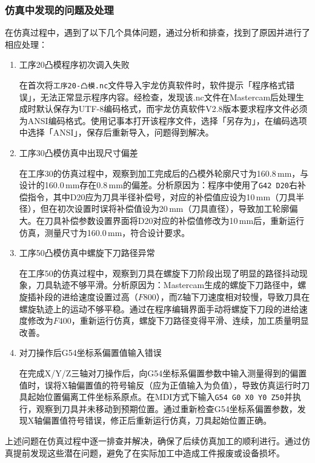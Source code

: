 \documentclass{xautCADreport}
\begin{document}
\subsubsection{仿真中发现的问题及处理}

在仿真过程中，遇到了以下几个具体问题，通过分析和排查，找到了原因并进行了相应处理：

\begin{enumerate}
  \item 工序20凸模程序初次调入失败
  
  在首次将\texttt{工序20-凸模.nc}文件导入宇龙仿真软件时，软件提示「程序格式错误」，无法正常显示程序内容。经检查，发现该.nc文件在Mastercam后处理生成时默认保存为UTF-8编码格式，而宇龙仿真软件V2.8版本要求程序文件必须为ANSI编码格式。使用记事本打开该程序文件，选择「另存为」，在编码选项中选择「ANSI」，保存后重新导入，问题得到解决。
  
  \item 工序30凸模仿真中出现尺寸偏差
  
  在工序30的仿真过程中，观察到加工完成后的凸模外轮廓尺寸为160.8\,mm，与设计的160.0\,mm存在0.8\,mm的偏差。分析原因为：程序中使用了\verb|G42 D20|右补偿指令，其中D20应为刀具半径补偿号，对应的补偿值应设为10\,mm（刀具半径），但在初次设置时误将补偿值设为20\,mm（刀具直径），导致加工轮廓偏大。在刀具补偿参数设置界面将D20对应的补偿值修改为10\,mm后，重新运行仿真，测量尺寸为160.0\,mm，符合设计要求。
  
  \item 工序50凸模仿真中螺旋下刀路径异常
  
  在工序50的仿真过程中，观察到刀具在螺旋下刀阶段出现了明显的路径抖动现象，刀具轨迹不够平滑。分析原因为：Mastercam生成的螺旋下刀路径中，螺旋插补段的进给速度设置过高（$F800$），而Z轴下刀速度相对较慢，导致刀具在螺旋轨迹上的运动不够平稳。通过在程序编辑界面手动将螺旋下刀段的进给速度修改为$F400$，重新运行仿真，螺旋下刀路径变得平滑、连续，加工质量明显改善。
  
  \item 对刀操作后G54坐标系偏置值输入错误
  
  在完成X/Y/Z三轴对刀操作后，向G54坐标系偏置参数中输入测量得到的偏置值时，误将X轴偏置值的符号输反（应为正值输入为负值），导致仿真运行时刀具起始位置偏离工件坐标系原点。在MDI方式下输入\verb|G54 G0 X0 Y0 Z50|并执行，观察到刀具并未移动到预期位置。通过重新检查G54坐标系偏置参数，发现X轴偏置值符号错误，修正后重新运行仿真，刀具起始位置正确。
\end{enumerate}

上述问题在仿真过程中逐一排查并解决，确保了后续仿真加工的顺利进行。通过仿真提前发现这些潜在问题，避免了在实际加工中造成工件报废或设备损坏。
\end{document}
